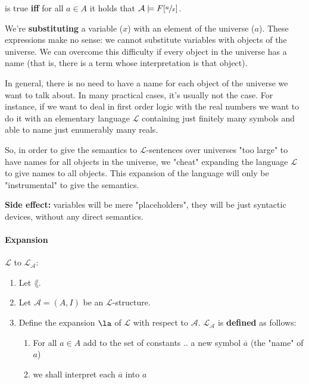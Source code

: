 \noindent
is true \textbf{iff} for all $a \in A$ it holds that $\mathcal{A} \models F[\sfrac{a}{x}]$.

We're \textbf{substituting} a variable ($x$) with an element of the universe ($a$). These expressions make no sense: we cannot substitute variables with objects of the universe. We can overcome this difficulty if every object in the universe has a name (that is, there is a term whose interpretation is that object).

In general, there is no need to have a name for each object of the universe we want to talk about. In many practical cases, it's usually not the case. For instance, if we want to deal in first order logic with the real numbers we want to do it with an elementary language $\mathcal{L}$ containing just finitely many symbols and able to name just enumerably many reals.

So, in order to give the semantics to $\mathcal{L}$-sentences over universes "too large" to have names for all objects in the universe, we "cheat" expanding the language $\mathcal{L}$ to give names to all objects. This expansion of the language will only be "instrumental" to give the semantics.

\textbf{Side effect:} variables will be mere "placeholders", they will be just syntactic devices, without any direct semantics.

\paragraph{Expansion} $\mathcal{L}$ to $\mathcal{L}_\mathcal{A}$:
\begin{enumerate}
	\item Let $\lang$.

	\item Let $\mathcal{A} = (A,I)$ be an $\mathcal{L}$-structure.

	  \bline

	\item Define the expansion $\la$ of $\mathcal{L}$ with respect to $\mathcal{A}$. $\mathcal{L}_\mathcal{A}$ is \textbf{defined} as follows:
	\begin{enumerate}
		\item For all $a \in A$ add to the set of constants .. a new symbol $\overline a$ (the "name" of $a$)
		\item we shall interpret each $\overline a$ into $a$ \\
	\end{enumerate}
\end{enumerate}

